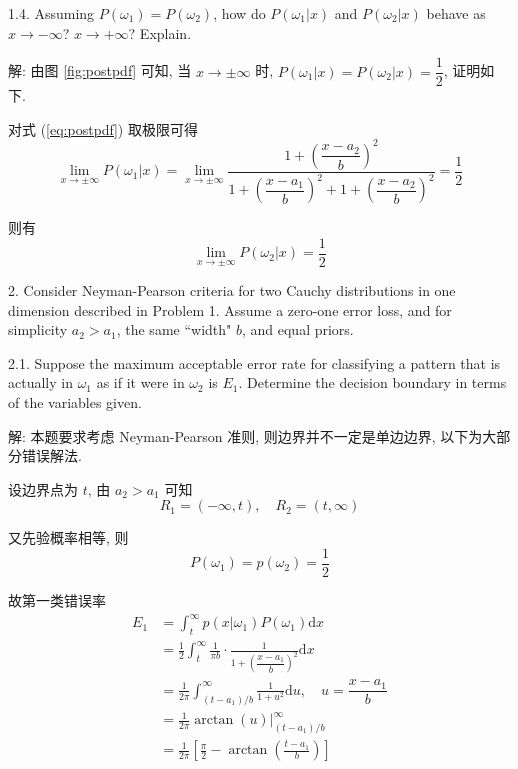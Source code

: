 \documentclass[openany]{ctexbook}
\theoremstyle{kaiti}
\theoremstyle{normal}
\begin{document}
1.4. Assuming $P(\omega_1) = P(\omega_2)$, how do $P(\omega_1|x)$ and $P(\omega_2|x)$ behave as $x \rightarrow -\infty$? $x\rightarrow +\infty$? Explain.

解: 由图 \ref{fig:postpdf} 可知, 当 $x \rightarrow \pm\infty$ 时, $P(\omega_1|x)=P(\omega_2|x)=\dfrac{1}{2}$, 证明如下.

对式 (\ref{eq:postpdf}) 取极限可得
\begin{equation}
  \lim_{x\to\pm\infty}P(\omega_1|x)
  =\lim_{x\to\pm\infty}\frac{1+\left(\dfrac{x-a_2}{b}\right)^2}{1+\left(\dfrac{x-a_1}{b}\right)^2+1+\left(\dfrac{x-a_2}{b}\right)^2}=\frac{1}{2}
\end{equation}

则有
\begin{equation}
  \lim_{x\to\pm\infty}P(\omega_2|x)
  =\frac{1}{2}
\end{equation}

2. Consider Neyman-Pearson criteria for two Cauchy distributions in one dimension described in Problem 1. Assume a zero-one error loss, and for simplicity $a_{2}>a_{1}$, the same ``width" $b$, and equal priors.

2.1. Suppose the maximum acceptable error rate for classifying a pattern that is actually in $\omega_{1}$ as if it were in $\omega_{2}$ is $E_{1}$. Determine the decision boundary in terms of the variables given.

解: 本题要求考虑 Neyman-Pearson 准则, 则边界并不一定是单边边界, 以下为大部分错误解法. 

设边界点为 $t$, 由 $a_{2}>a_{1}$ 可知
\begin{equation}
  R_1=(-\infty,t),\quad R_2=(t,\infty)
\end{equation}

又先验概率相等, 则
\begin{equation}
  P(\omega_1)=p(\omega_2)=\frac{1}{2}
\end{equation}

故第一类错误率
\begin{equation}
  \begin{aligned}
    E_1
    &=\int_t^\infty p(x|\omega_1)P(\omega_1)\mathrm{d}x\\
    &=\frac{1}{2}\int_t^\infty \frac{1}{\pi b} \cdot \frac{1}{1+\left(\dfrac{x-a_1}{b}\right)^2}\mathrm{d}x\\
    &=\frac{1}{2\pi}\int_{(t-a_1)/b}^\infty \frac{1}{1+u^2}\mathrm{d}u,\quad u=\dfrac{x-a_1}{b}\\
    &=\frac{1}{2\pi}\arctan(u)\Big|_{(t-a_1)/b}^\infty\\
    &=\frac{1}{2\pi}\left[\frac{\pi}{2}-\arctan\left(\frac{t-a_1}{b}\right)\right]
  \end{aligned}
\end{equation}
\end{document}
